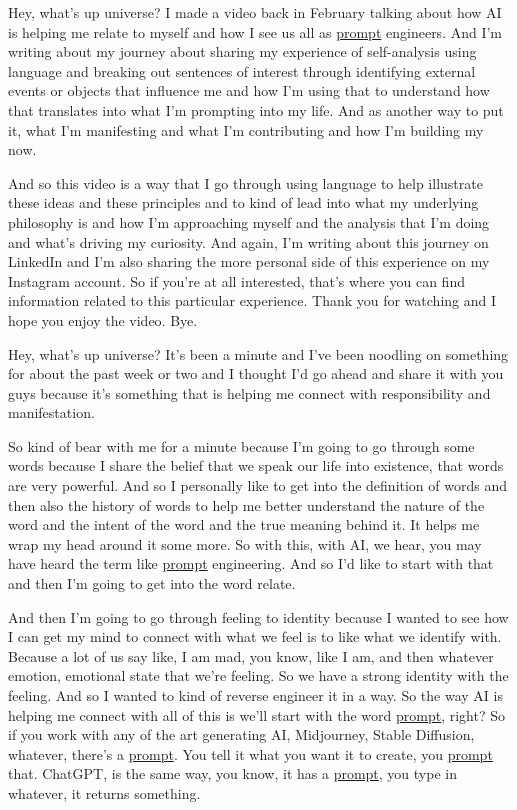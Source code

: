 \documentclass{article}
\begin{document}
Hey, what's up universe? I made a video back in February talking about how AI is helping me relate to myself and how I see us all as \hyperlink{gloss:prompt}{prompt} engineers. And I'm writing about my journey about sharing my experience of self-analysis using language and breaking out sentences of interest through identifying external events or objects that influence me and how I'm using that to understand how that translates into what I'm prompting into my life. And as another way to put it, what I'm manifesting and what I'm contributing and how I'm building my now.

And so this video is a way that I go through using language to help illustrate these ideas and these principles and to kind of lead into what my underlying philosophy is and how I'm approaching myself and the analysis that I'm doing and what's driving my curiosity. And again, I'm writing about this journey on LinkedIn and I'm also sharing the more personal side of this experience on my Instagram account. So if you're at all interested, that's where you can find information related to this particular experience. Thank you for watching and I hope you enjoy the video. Bye.

Hey, what's up universe? It's been a minute and I've been noodling on something for about the past week or two and I thought I'd go ahead and share it with you guys because it's something that is helping me connect with responsibility and manifestation.

So kind of bear with me for a minute because I'm going to go through some words because I share the belief that we speak our life into existence, that words are very powerful. And so I personally like to get into the definition of words and then also the history of words to help me better understand the nature of the word and the intent of the word and the true meaning behind it. It helps me wrap my head around it some more. So with this, with AI, we hear, you may have heard the term like \hyperlink{gloss:prompt}{prompt} engineering. And so I'd like to start with that and then I'm going to get into the word relate.

And then I'm going to go through feeling to identity because I wanted to see how I can get my mind to connect with what we feel is to like what we identify with. Because a lot of us say like, I am mad, you know, like I am, and then whatever emotion, emotional state that we're feeling. So we have a strong identity with the feeling. And so I wanted to kind of reverse engineer it in a way. So the way AI is helping me connect with all of this is we'll start with the word \hyperlink{gloss:prompt}{prompt}, right? So if you work with any of the art generating AI, Midjourney, Stable Diffusion, whatever, there's a \hyperlink{gloss:prompt}{prompt}. You tell it what you want it to create, you \hyperlink{gloss:prompt}{prompt} that. ChatGPT, is the same way, you know, it has a \hyperlink{gloss:prompt}{prompt}, you type in whatever, it returns something.
\end{document}
